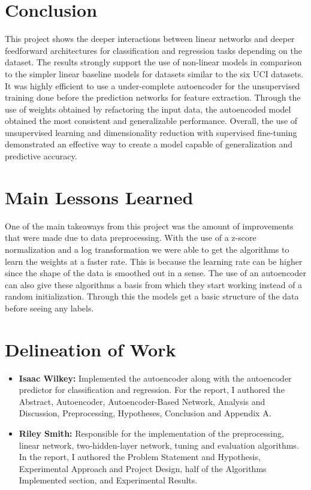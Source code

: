 \documentclass[twoside,11pt]{article}
\begin{document}
\section{Conclusion}
This project shows the deeper interactions between linear networks and deeper feedforward architectures for classification and regression tasks depending on the dataset. The results strongly support the use of non-linear models in comparison to the simpler linear baseline models for datasets similar to the six UCI datasets. It was highly efficient to use a under-complete autoencoder for the unsupervised training done before the prediction networks for feature extraction. Through the use of weights obtained by refactoring the input data, the autoencoded model obtained the most consistent and generalizable performance. Overall, the use of unsupervised learning and dimensionality reduction with supervised fine-tuning demonstrated an effective way to create a model capable of generalization and predictive accuracy. 



\newpage

\appendix
\section{Main Lessons Learned}
One of the main takeaways from this project was the amount of improvements that were made due to data preprocessing. With the use of a z-score normalization and a log transformation we were able to get the algorithms to learn the weights at a faster rate. This is because the learning rate can be higher since the shape of the data is smoothed out in a sense. The use of an autoencoder can also give these algorithms a basis from which they start working instead of a random initialization. Through this the models get a basic structure of the data before seeing any labels.

\section{Delineation of Work}
\begin{itemize}
    \item \textbf{Isaac Wilkey:} 
    Implemented the autoencoder along with the autoencoder predictor for classification and regression. For the report, I authored the Abstract, Autoencoder, Autoencoder-Based Network, Analysis and Discussion, Preprocessing, Hypotheses, Conclusion and Appendix A. 
    \item \textbf{Riley Smith:} Responsible for the implementation of the preprocessing, linear network, two-hidden-layer network, tuning and evaluation algorithms. In the report, I authored the Problem Statement and Hypothesis, Experimental Approach and Project Design, half of the Algorithms Implemented section, and Experimental Results.
\end{itemize}
\end{document}
